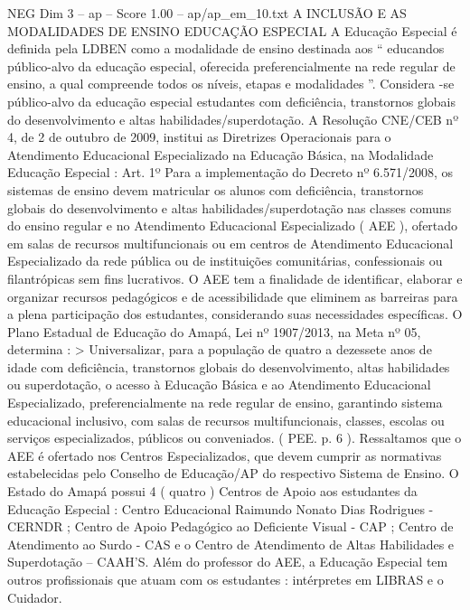 \begin{textsample}{NEG Dim 3 – ap – Score 1.00 – ap/ap\_em\_10.txt}  \label{ex:f3_neg_107}
A INCLUSÃO E AS MODALIDADES DE ENSINO EDUCAÇÃO ESPECIAL A Educação Especial é definida pela LDBEN como a modalidade de ensino destinada aos “ educandos público-alvo da educação especial, oferecida preferencialmente na rede regular de ensino, a qual compreende todos os níveis, etapas e modalidades ”.
Considera -se público-alvo da educação especial estudantes com deficiência, transtornos globais do desenvolvimento e altas habilidades/superdotação.
A Resolução CNE/CEB nº 4, de 2 de outubro de 2009, institui as Diretrizes Operacionais para o Atendimento Educacional Especializado na Educação Básica, na Modalidade Educação Especial : Art. 1º Para a implementação do Decreto nº 6.571/2008, os sistemas de ensino devem matricular os alunos com deficiência, transtornos globais do desenvolvimento e altas habilidades/superdotação nas classes comuns do ensino regular e no Atendimento Educacional Especializado ( AEE ), ofertado em salas de recursos multifuncionais ou em centros de Atendimento Educacional Especializado da rede pública ou de instituições comunitárias, confessionais ou filantrópicas sem fins lucrativos.
O AEE tem a finalidade de identificar, elaborar e organizar recursos pedagógicos e de acessibilidade que eliminem as barreiras para a plena participação dos estudantes, considerando suas necessidades específicas.
O Plano Estadual de Educação do Amapá, Lei nº 1907/2013, na Meta nº 05, determina : > Universalizar, para a população de quatro a dezessete anos de idade com deficiência, transtornos globais do desenvolvimento, altas habilidades ou superdotação, o acesso à Educação Básica e ao Atendimento Educacional Especializado, preferencialmente na rede regular de ensino, garantindo sistema educacional inclusivo, com salas de recursos multifuncionais, classes, escolas ou serviços especializados, públicos ou conveniados. ( PEE. p. 6 ).
Ressaltamos que o AEE é ofertado nos Centros Especializados, que devem cumprir as normativas estabelecidas pelo Conselho de Educação/AP do respectivo Sistema de Ensino.
O Estado do Amapá possui 4 ( quatro ) Centros de Apoio aos estudantes da Educação Especial : Centro Educacional Raimundo Nonato Dias Rodrigues - CERNDR ; Centro de Apoio Pedagógico ao Deficiente Visual - CAP ; Centro de Atendimento ao Surdo - CAS e o Centro de Atendimento de Altas Habilidades e Superdotação – CAAH'S.
Além do professor do AEE, a Educação Especial tem outros profissionais que atuam com os estudantes : intérpretes em LIBRAS e o Cuidador.

\end{textsample}
